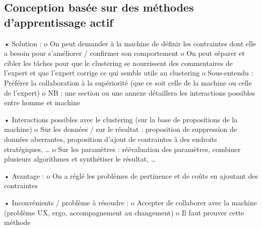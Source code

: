         \subsection{Conception basée sur des méthodes d’apprentissage actif}

            •	Solution :
                o	On peut demander à la machine de définir les contraintes dont elle a besoin pour s’améliorer / confirmer son comportement
                o	On peut séparer et cibler les tâches pour que le clustering se nourrissent des commentaires de l’expert et que l’expert corrige ce qui semble utile au clustering
                o	Sous-entendu : Préférer la collaboration à la supériorité (que ce soit celle de la machine ou celle de l’expert)
                o	NB : une section ou une annexe détaillera les interactions possibles entre homme et machine

            •   Interactions possibles avec le clustering (sur la base de propositions de la machine)
                o	Sur les données / sur le résultat : proposition de suppression de données aberrantes, proposition d'ajout de contraintes à des endroits stratégiques, …
                o	Sur les paramètres : réévaluation des paramètres, combiner plusieurs algorithmes et synthétiser le résultat, …

            •	Avantage :
                o	On a réglé les problèmes de pertinence et de coûts en ajoutant des contraintes

            •	Inconvénients / problème à résoudre : 
                o	Accepter de collaborer avec la machine (problème UX, ergo, accompagnement au changement)
                o	Il faut prouver cette méthode